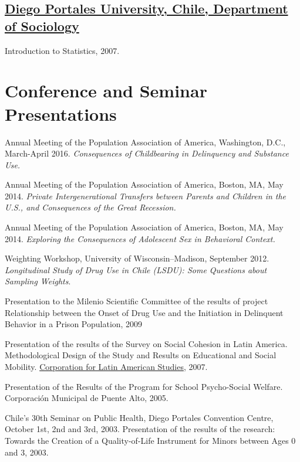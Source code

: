 \documentclass[10pt,letterpaper]{article}
\renewenvironment{itemize}{
  \begin{list}{}{
    \setlength{\leftmargin}{1.5em}
    \setlength{\itemsep}{0.25em}
    \setlength{\parskip}{0pt}
    \setlength{\parsep}{0.25em}
  }
}{
  \end{list}
}
\begin{document}
\subsection*{\href{http://www.udp.cl/facultades_carreras/ciencias_sociales-historia/}{Diego Portales University, Chile, Department of Sociology}}

\begin{itemize}
\item Introduction to Statistics, 2007.
\end{itemize}


\section*{Conference and Seminar Presentations}

\begin{itemize}

\item  Annual Meeting of the Population Association of America, Washington, D.C., March-April 2016. {\textit{Consequences of Childbearing in Delinquency and Substance Use.}}
\item  Annual Meeting of the Population Association of America, Boston, MA, May 2014. {\textit{Private Intergenerational Transfers between Parents and Children in the U.S., and Consequences of the Great Recession.}}
\item  Annual Meeting of the Population Association of America, Boston, MA, May 2014. {\textit{Exploring the Consequences of Adolescent Sex in Behavioral Context.}}
\item Weighting Workshop, University of Wisconsin–Madison, September 2012. \textit{Longitudinal Study of Drug Use in Chile (LSDU): Some Questions about Sampling Weights}.
\item	Presentation to the Milenio Scientific Committee of the results of project Relationship between the Onset of Drug Use and the Initiation in Delinquent Behavior in a Prison Population, 2009
\item Presentation of the results of the Survey on Social Cohesion in Latin America. Methodological Design of the Study and Results on Educational and Social Mobility. \href{http://www.cieplan.org/}{Corporation for Latin American Studies}, 2007.
\item Presentation of the Results of the Program for School Psycho-Social Welfare. Corporación Municipal de Puente Alto, 2005.
\item Chile’s 30th Seminar on Public Health, Diego Portales Convention Centre, October 1st, 2nd and 3rd, 2003. Presentation of the results of the research: Towards the Creation of a Quality-of-Life Instrument for Minors between Ages 0 and 3, 2003.


\end{itemize}
\end{document}
